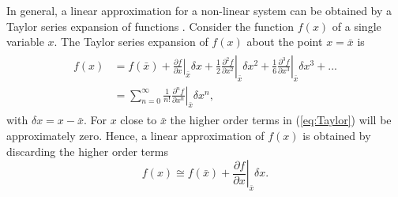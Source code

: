 \documentclass[preprint,authoryear,12pt]{elsarticle}
\begin{document}
In general, a linear approximation for a non-linear system can be obtained by a Taylor series expansion of functions \citep{Seborg2011}. Consider the function $f(x)$ of a single variable $x$. The Taylor series expansion of $f(x)$ about the point $x = \bar{x}$ is 
\begin{align}
\begin{split}
f(x) &= f(\bar{x}) + \left.\frac{\partial f}{\partial x}\right\rvert_{\bar{x}} \delta x + \frac{1}{2}\left.\frac{\partial^2 f}{\partial x^2}\right\rvert_{\bar{x}} \delta x^2 + 
\frac{1}{6}\left.\frac{\partial^3 f}{\partial x^3}\right\rvert_{\bar{x}} \delta x^3 +  ... \\
&= \sum_{n=0}^{\infty}\frac{1}{n!} \left.\frac{\partial^n f}{\partial x^n}\right\rvert_{\bar{x}}\delta x^n ,
\end{split}
\label{eq:Taylor}
\end{align}
with $\delta x = x - \bar{x}$. For $x$ close to $\bar{x}$ the higher order terms in (\ref{eq:Taylor}) will be approximately zero. Hence, a linear approximation of $f(x)$ is obtained by discarding the higher order terms
\begin{equation}
f(x) \cong f(\bar{x}) + \left.\frac{\partial f}{\partial x}\right\rvert_{\bar{x}} \delta x . 
\label{eq:LinearTaylor}
\end{equation}
\end{document}
